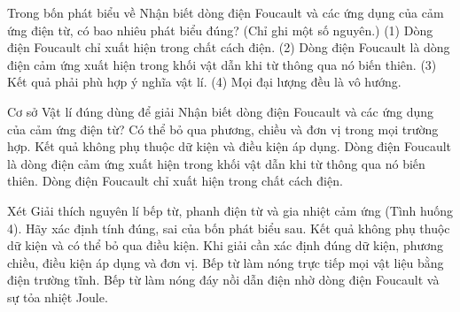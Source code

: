 \begin{ex}
Trong bốn phát biểu về Nhận biết dòng điện Foucault và các ứng dụng của cảm ứng điện từ, có bao nhiêu phát biểu đúng? (Chỉ ghi một số nguyên.) (1) Dòng điện Foucault chỉ xuất hiện trong chất cách điện. (2) Dòng điện Foucault là dòng điện cảm ứng xuất hiện trong khối vật dẫn khi từ thông qua nó biến thiên. (3) Kết quả phải phù hợp ý nghĩa vật lí. (4) Mọi đại lượng đều là vô hướng.
\end{ex}

\begin{ex}
Cơ sở Vật lí đúng dùng để giải Nhận biết dòng điện Foucault và các ứng dụng của cảm ứng điện từ?
\choice
{Có thể bỏ qua phương, chiều và đơn vị trong mọi trường hợp.}
{Kết quả không phụ thuộc dữ kiện và điều kiện áp dụng.}
{\True Dòng điện Foucault là dòng điện cảm ứng xuất hiện trong khối vật dẫn khi từ thông qua nó biến thiên.}
{Dòng điện Foucault chỉ xuất hiện trong chất cách điện.}
\end{ex}

\begin{ex}
Xét Giải thích nguyên lí bếp từ, phanh điện từ và gia nhiệt cảm ứng (Tình huống 4). Hãy xác định tính đúng, sai của bốn phát biểu sau.
\choiceTF
{Kết quả không phụ thuộc dữ kiện và có thể bỏ qua điều kiện.}
{\True Khi giải cần xác định đúng dữ kiện, phương chiều, điều kiện áp dụng và đơn vị.}
{Bếp từ làm nóng trực tiếp mọi vật liệu bằng điện trường tĩnh.}
{\True Bếp từ làm nóng đáy nồi dẫn điện nhờ dòng điện Foucault và sự tỏa nhiệt Joule.}
\end{ex}

